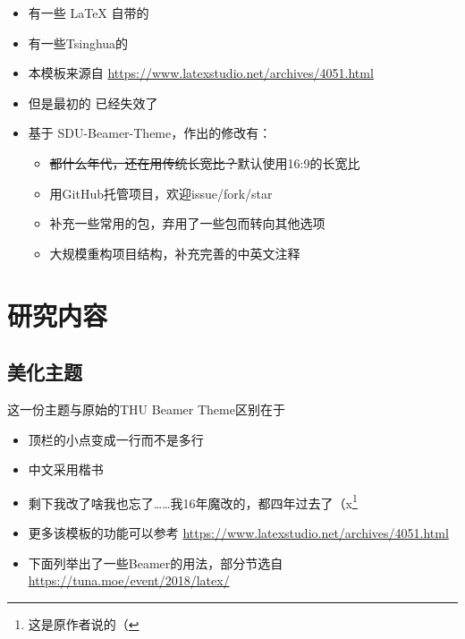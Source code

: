 \documentclass[aspectratio=169]{beamer}
\begin{document}
\begin{frame}
    \begin{itemize}
        \item 有一些 \LaTeX{} 自带的
        \item 有一些Tsinghua的
        \item 本模板来源自 \newline \url{https://www.latexstudio.net/archives/4051.html}
        \item 但是最初的 \href{http://far.tooold.cn/post/latex/beamertsinghua}{\color{purple}{link}} \cite{origin}已经失效了
        \newline
        \item 基于 SDU-Beamer-Theme，作出的修改有：
            \begin{itemize}
                \item \sout{都什么年代，还在用传统长宽比？}默认使用16:9的长宽比
                \item 用GitHub托管项目，欢迎issue/fork/star
                \item 补充一些常用的包，弃用了一些包而转向其他选项
                \item 大规模重构项目结构，补充完善的中英文注释
            \end{itemize}
    \end{itemize}
\end{frame}

\section{研究内容}

\subsection{美化主题}

\begin{frame}{这一份主题与原始的THU Beamer Theme区别在于}
    \begin{itemize}
        \item 顶栏的小点变成一行而不是多行
        \item 中文采用楷书
        \item 剩下我改了啥我也忘了……我16年魔改的，都四年过去了（x\footnote{这是原作者说的（}
        \item 更多该模板的功能可以参考 \url{https://www.latexstudio.net/archives/4051.html}
        \item 下面列举出了一些Beamer的用法，部分节选自 \url{https://tuna.moe/event/2018/latex/}
    \end{itemize}
\end{frame}
\end{document}
